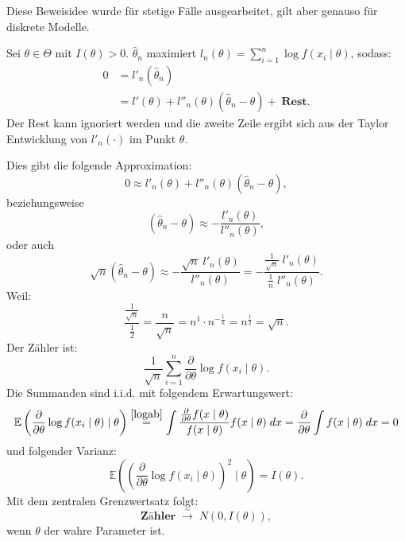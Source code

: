 \documentclass[10pt]{article}
\newcommand{\EW}{\mathbb{E}} %
\newcommand{\KV}{\overset{\sim} \longrightarrow} %
\newcommand{\xt}{x \mid \theta} %
\newcommand{\ablt}{\frac{\partial}{\partial \theta}}
\newenvironment{BWS}[1][]
{\begin{Beweis}[frametitle=#1]}{\end{Beweis}}
\begin{document}
	\begin{BWS}[Beweisidee 1.3.6 (Verteilung des Schätzfehlers)]
		Diese Beweisidee wurde für stetige Fälle ausgearbeitet, gilt aber genauso für diskrete Modelle. 
		
		Sei $\theta \in \Theta$ mit $I(\theta) > 0$. $\hat{\theta}_n$ maximiert $l_n (\theta) = \sum_{i=1}^{n} \log f (x_i \mid \theta)$, sodass:
		\begin{equation*}
			\begin{split}
				0 &= l'_n (\hat{\theta}_n) \\
				&= l'(\theta) + l''_n(\theta) (\hat{\theta}_n - \theta) + \; \textbf{Rest}.
			\end{split}
		\end{equation*}
		Der Rest kann ignoriert werden und die zweite Zeile ergibt sich aus der Taylor Entwicklung von $l'_{n}(\cdot)$ im Punkt $\theta$. 
		
		Dies gibt die folgende Approximation:
		\begin{equation*}
			0 \approx l'_n (\theta) +  l''_n(\theta) (\hat{\theta}_n - \theta),
		\end{equation*}
		beziehungsweise
		\begin{equation*}
			(\hat{\theta}_n - \theta) \approx -\frac{l'_n (\theta)}{l''_n(\theta)},
		\end{equation*}
		oder auch
		\begin{equation*}
			\sqrt{n} (\hat{\theta}_n - \theta) \approx -\frac{\sqrt{n}\;l'_n(\theta)}{l''_n(\theta)} = -\frac{\frac{1}{\sqrt{n} } \; l'_n(\theta)}{\frac{1}{n}\;l''_n(\theta)}.
		\end{equation*}
		Weil:
		\begin{equation*}
			\frac{\frac{1}{\sqrt{n}}}{\frac{1}{2}} = \frac{n}{\sqrt{n}} = n^1 \cdot n^{-\frac{1}{n}} = n^{\frac{1}{2}} = \sqrt{n}.
		\end{equation*}
		Der Zähler ist:
		\begin{equation*}
			\frac{1}{\sqrt{n}}\sum_{i=1}^{n} \frac{\partial}{\partial \theta} \log f(x_i \mid \theta).
		\end{equation*}
		Die Summanden sind i.i.d. mit folgendem Erwartungswert:
		\begin{equation*}
			\EW\left(\ablt \log f(x_i \mid \theta) \mid \theta\right) \overset{\ref{logab}}{=} \int \frac{\ablt f(x \mid \theta)}{f(\xt)} f(\xt) \; dx = \ablt \int f(\xt) \; dx = 0
		\end{equation*}
		und folgender Varianz:
		\begin{equation*}
			\EW\left(\left(\ablt \log f(x_i \mid \theta)\right)^2 \mid \theta\right) = I(\theta).
		\end{equation*}
		Mit dem zentralen Grenzwertsatz folgt:
		\begin{equation*}
			\textbf{Zähler} \; \KV \; N(0,I(\theta)),
		\end{equation*}
		wenn $\theta$ der wahre Parameter ist.
		

\end{BWS}
\end{document}
